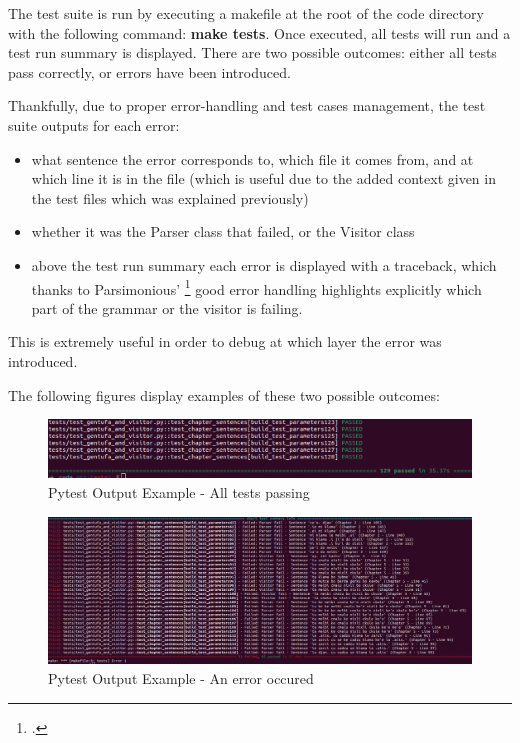 The test suite is run by executing a makefile at the root of the code directory with the following command: \textbf{make tests}.
Once executed, all tests will run and a test run summary is displayed. There are two possible outcomes: either all tests pass correctly,
or errors have been introduced. \newline

Thankfully, due to proper error-handling and test cases management, the test suite outputs for each error:

\begin{itemize}
    \item what sentence the error corresponds to, which file it comes from, and at which line it is in the file (which is useful due to the
    added context given in the test files which was explained previously)
    \item whether it was the Parser class that failed, or the Visitor class
    \item above the test run summary each error is displayed with a traceback, which thanks to Parsimonious' \footcite{parsimonious} good error
    handling highlights explicitly which part of the grammar or the visitor is failing.
\end{itemize}

This is extremely useful in order to debug at which layer the error was introduced. \newline

The following figures display examples of these two possible outcomes:\newline

\begin{figure}[H]
\hspace{-1.1cm}
\includegraphics[scale=0.43]{images/pytest_output_pass.png}
\caption{Pytest Output Example - All tests passing}
\end{figure}

\begin{figure}[H]
\hspace{-1.8cm}
\includegraphics[scale=0.30]{images/pytest_output_fail.png}
\caption{Pytest Output Example - An error occured}
\end{figure}